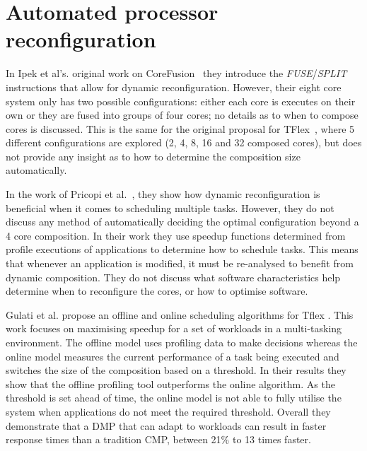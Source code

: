\section{Automated processor reconfiguration}

In Ipek et al's. original work on CoreFusion~\cite{ipek2007CoreFusion} they introduce the \textit{FUSE}/\textit{SPLIT} instructions that allow for dynamic reconfiguration.
However, their eight core system only has two possible configurations: either each core is executes on their own or they are fused into groups of four cores; no details as to when to compose cores is discussed.
This is the same for the original proposal for TFlex~\cite{kim2007tflex}, where 5 different configurations are explored (2, 4, 8, 16 and 32 composed cores), but does not provide any insight as to how to determine the composition size automatically.

In the work of Pricopi et al.~\cite{pricopiSchedCoreComp2014}, they show how dynamic reconfiguration is beneficial when it comes to scheduling multiple tasks.
However, they do not discuss any method of automatically deciding the optimal configuration beyond a 4 core composition.
In their work they use speedup functions determined from profile executions of applications to determine how to schedule tasks.
This means that whenever an application is modified, it must be re-analysed to benefit from dynamic composition.
They do not discuss what software characteristics help determine when to reconfigure the cores, or how to optimise software.

Gulati et al. propose an offline and online scheduling algorithms for Tflex \cite{gulati2008multitaskingdmc}. 
This work focuses on maximising speedup for a set of workloads in a multi-tasking environment.
The offline model uses profiling data to make decisions whereas the online model measures the current performance of a task being executed and switches the size of the composition based on a threshold.
In their results they show that the offline profiling tool outperforms the online algorithm.
As the threshold is set ahead of time, the online model is not able to fully utilise the system when applications do not meet the required threshold.
Overall they demonstrate that a DMP that can adapt to workloads can result in faster response times than a tradition CMP, between 21\% to 13 times faster.


